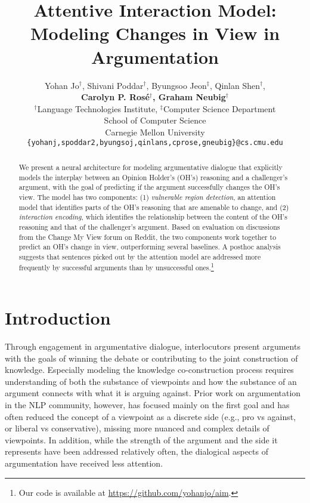 \documentclass[11pt,a4paper]{article}
\title{Attentive Interaction Model:\\Modeling Changes in View in Argumentation}
\author{Yohan Jo$^\dagger$, Shivani Poddar$^\dagger$, Byungsoo Jeon$^\ddagger$, Qinlan Shen$^\dagger$,\\\textbf{Carolyn P. Ros\'{e}$^\dagger$, Graham Neubig$^\dagger$}\\
  $^\dagger$Language Technologies Institute, $^\ddagger$Computer Science Department \\
  School of Computer Science \\
  Carnegie Mellon University \\
  {\tt \{yohanj,spoddar2,byungsoj,qinlans,cprose,gneubig\}@cs.cmu.edu}}
\date{}
\begin{document}
\maketitle

\begin{abstract}
We present a neural architecture for modeling argumentative dialogue that explicitly models the interplay between an Opinion Holder's (OH's) reasoning and a challenger's argument, with the goal of predicting if the argument successfully changes the OH's view. The model has two components:
(1) \emph{vulnerable region detection}, an attention model that identifies parts of the OH's reasoning that are amenable to change, and (2) \emph{interaction encoding}, which identifies the relationship between the content of the OH's reasoning and that of the challenger's argument. Based on evaluation on discussions from the Change My View forum on Reddit, the two components work together to predict an OH's change in view, outperforming several baselines. A posthoc analysis suggests that sentences picked out by the attention model are addressed more frequently by successful arguments than by unsuccessful ones.\footnote{Our code is available at \url{https://github.com/yohanjo/aim}.}
\end{abstract}

\section{Introduction\label{sec:introduction}}

Through engagement in argumentative dialogue, interlocutors present arguments with the goals of winning the debate or contributing to the joint construction of knowledge. Especially modeling the knowledge co-construction process requires understanding of both the substance of viewpoints and how the substance of an argument connects with what it is arguing against. Prior work on argumentation in the NLP community, however, has focused mainly on the first goal and has often reduced the concept of a viewpoint as a discrete side (e.g., pro vs against, or liberal vs conservative), missing more nuanced and complex details of viewpoints. In addition, while the strength of the argument and the side it represents have been addressed relatively often, the dialogical aspects of argumentation have received less attention.
\end{document}
